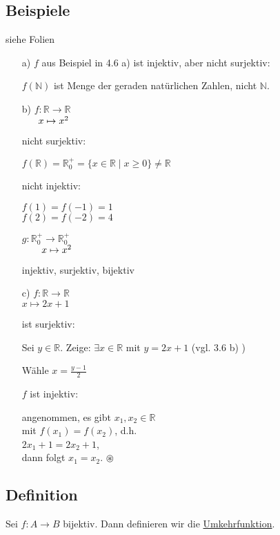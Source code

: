 \documentclass[a4paper, 12pt, twoside] {article}
\begin{document}
\subsection{Beispiele} %
siehe Folien

\begin{itemize}
\item[a)] $f$ aus Beispiel in 4.6 a) ist injektiv, aber nicht surjektiv:

$f(\mathbb{N})$ ist Menge der geraden natürlichen Zahlen, nicht $\mathbb{N}$.

\item[b)] $f \colon \mathbb{R} \rightarrow \mathbb{R}$ \\
$\text{\space\quad\space} x \mapsto x^2$

nicht surjektiv:

$f(\mathbb{R}) = \mathbb{R}^+_0 = \{x \in \mathbb{R} \mid x \geq 0 \} \neq \mathbb{R}$

nicht injektiv:

$f(1) = f(-1) = 1$ \\
$f(2) = f(-2) = 4$

\hfill

$g \colon \mathbb{R}^+_0 \rightarrow \mathbb{R}^+_0$ \\
$\text{\qquad} x \mapsto x^2$

injektiv, surjektiv, bijektiv

\item[c)] $f \colon \mathbb{R} \rightarrow \mathbb{R}$ \\
	$x \mapsto 2x+1$
	
	ist surjektiv:
	
	Sei $y \in \mathbb{R}$. Zeige: $\exists x \in \mathbb{R}$ mit $y = 2x+1$ (vgl. 3.6 b) )
	
	Wähle $x = \frac{y-1}{2}$
	
	$f$ ist injektiv:
	
	angenommen, es gibt $x_1,x_2 \in \mathbb{R}$ \\
	mit $f(x_1) = f(x_2)$, d.h. \\
	$2x_1+1 = 2x_2+1$, \\
	dann folgt $x_1 = x_2$. \qquad $\circledast$	
\end{itemize}


\subsection[Definition (Umkehrfunktion)]{Definition} %
Sei $f \colon A \rightarrow B$ bijektiv. Dann definieren wir die \underline{Umkehrfunktion}.
\end{document}
